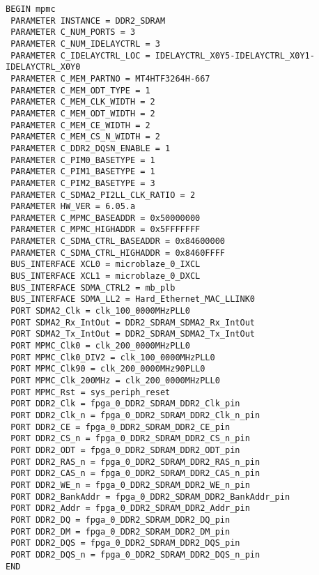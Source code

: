 \begin{verbatim}
BEGIN mpmc
 PARAMETER INSTANCE = DDR2_SDRAM
 PARAMETER C_NUM_PORTS = 3
 PARAMETER C_NUM_IDELAYCTRL = 3
 PARAMETER C_IDELAYCTRL_LOC = IDELAYCTRL_X0Y5-IDELAYCTRL_X0Y1-IDELAYCTRL_X0Y0
 PARAMETER C_MEM_PARTNO = MT4HTF3264H-667
 PARAMETER C_MEM_ODT_TYPE = 1
 PARAMETER C_MEM_CLK_WIDTH = 2
 PARAMETER C_MEM_ODT_WIDTH = 2
 PARAMETER C_MEM_CE_WIDTH = 2
 PARAMETER C_MEM_CS_N_WIDTH = 2
 PARAMETER C_DDR2_DQSN_ENABLE = 1
 PARAMETER C_PIM0_BASETYPE = 1
 PARAMETER C_PIM1_BASETYPE = 1
 PARAMETER C_PIM2_BASETYPE = 3
 PARAMETER C_SDMA2_PI2LL_CLK_RATIO = 2
 PARAMETER HW_VER = 6.05.a
 PARAMETER C_MPMC_BASEADDR = 0x50000000
 PARAMETER C_MPMC_HIGHADDR = 0x5FFFFFFF
 PARAMETER C_SDMA_CTRL_BASEADDR = 0x84600000
 PARAMETER C_SDMA_CTRL_HIGHADDR = 0x8460FFFF
 BUS_INTERFACE XCL0 = microblaze_0_IXCL
 BUS_INTERFACE XCL1 = microblaze_0_DXCL
 BUS_INTERFACE SDMA_CTRL2 = mb_plb
 BUS_INTERFACE SDMA_LL2 = Hard_Ethernet_MAC_LLINK0
 PORT SDMA2_Clk = clk_100_0000MHzPLL0
 PORT SDMA2_Rx_IntOut = DDR2_SDRAM_SDMA2_Rx_IntOut
 PORT SDMA2_Tx_IntOut = DDR2_SDRAM_SDMA2_Tx_IntOut
 PORT MPMC_Clk0 = clk_200_0000MHzPLL0
 PORT MPMC_Clk0_DIV2 = clk_100_0000MHzPLL0
 PORT MPMC_Clk90 = clk_200_0000MHz90PLL0
 PORT MPMC_Clk_200MHz = clk_200_0000MHzPLL0
 PORT MPMC_Rst = sys_periph_reset
 PORT DDR2_Clk = fpga_0_DDR2_SDRAM_DDR2_Clk_pin
 PORT DDR2_Clk_n = fpga_0_DDR2_SDRAM_DDR2_Clk_n_pin
 PORT DDR2_CE = fpga_0_DDR2_SDRAM_DDR2_CE_pin
 PORT DDR2_CS_n = fpga_0_DDR2_SDRAM_DDR2_CS_n_pin
 PORT DDR2_ODT = fpga_0_DDR2_SDRAM_DDR2_ODT_pin
 PORT DDR2_RAS_n = fpga_0_DDR2_SDRAM_DDR2_RAS_n_pin
 PORT DDR2_CAS_n = fpga_0_DDR2_SDRAM_DDR2_CAS_n_pin
 PORT DDR2_WE_n = fpga_0_DDR2_SDRAM_DDR2_WE_n_pin
 PORT DDR2_BankAddr = fpga_0_DDR2_SDRAM_DDR2_BankAddr_pin
 PORT DDR2_Addr = fpga_0_DDR2_SDRAM_DDR2_Addr_pin
 PORT DDR2_DQ = fpga_0_DDR2_SDRAM_DDR2_DQ_pin
 PORT DDR2_DM = fpga_0_DDR2_SDRAM_DDR2_DM_pin
 PORT DDR2_DQS = fpga_0_DDR2_SDRAM_DDR2_DQS_pin
 PORT DDR2_DQS_n = fpga_0_DDR2_SDRAM_DDR2_DQS_n_pin
END


\end{verbatim}
